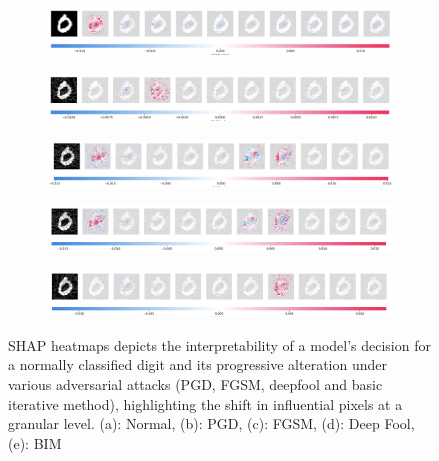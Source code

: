 \documentclass[10pt, conference, a4paper, final]{IEEEtran}
\begin{document}
\begin{figure}[h]
\centering
\begin{subfigure}{\columnwidth}
\centering
\includegraphics[width=\linewidth]{paper_images/normal.png}
\label{fig:correct_shap}
\end{subfigure}
\par\medskip
\begin{subfigure}{\columnwidth}
\centering
\includegraphics[width=\linewidth]{paper_images/pgd.png}
\label{fig:pgd}
\end{subfigure}
\begin{subfigure}{\columnwidth}
\centering
\includegraphics[width=\linewidth]{paper_images/fgsm.png}
\label{fig:fgsm}
\end{subfigure}
\begin{subfigure}{\columnwidth}
\centering
\includegraphics[width=\linewidth]{paper_images/deep.png}
\label{fig:deep}
\end{subfigure}
\begin{subfigure}{\columnwidth}
\centering
\includegraphics[width=\linewidth]{paper_images/basic.png}
\label{fig:basic}
\end{subfigure}
\caption{SHAP heatmaps depicts the interpretability of a model's decision for a normally classified digit and its progressive alteration under various adversarial attacks (PGD, FGSM, deepfool and basic iterative method), highlighting the shift in influential pixels at a granular level. (a): Normal, (b): PGD, (c): FGSM, (d): Deep Fool, (e): BIM}
\label{fig:both_shap_figures}
\end{figure}
\end{document}
